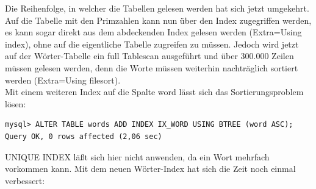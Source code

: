 Die Reihenfolge, in welcher die Tabellen gelesen werden hat sich jetzt umgekehrt.
Auf die Tabelle mit den Primzahlen kann nun über den Index zugegriffen werden, es kann sogar direkt aus dem abdeckenden Index gelesen werden (Extra=Using index), ohne auf die eigentliche Tabelle zugreifen zu müssen. Jedoch wird jetzt auf der Wörter-Tabelle ein full Tablescan ausgeführt und über 300.000 Zeilen müssen gelesen werden, denn die Worte müssen weiterhin nachträglich sortiert werden (Extra=Using filesort).\\
Mit einem weiteren Index auf die Spalte word lässt sich das Sortierungsproblem lösen:
\begin{lstlisting}
mysql> ALTER TABLE words ADD INDEX IX_WORD USING BTREE (word ASC);
Query OK, 0 rows affected (2,06 sec)
\end{lstlisting}
UNIQUE INDEX läßt sich hier nicht anwenden, da ein Wort mehrfach vorkommen kann.
Mit dem neuen Wörter-Index hat sich die Zeit noch einmal verbessert:

